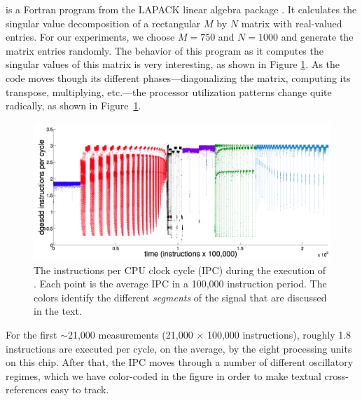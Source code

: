\svd is a Fortran program from the LAPACK linear algebra package
\cite{lapack}.  It calculates the singular value decomposition of a
rectangular $M$ by $N$ matrix with real-valued entries.  For our experiments, we
choose $M=750$ and $N=1000$ and generate the matrix entries randomly.
% 
% 
The behavior of this program as it computes the singular values of
this matrix is very interesting, as shown in Figure
\ref{fig:svd-ts-colored}.  As the code moves though its different
phases---diagonalizing the matrix, computing its transpose,
multiplying, etc.---the processor utilization patterns change quite radically,
as shown in Figure~\ref{fig:svd-ts-colored}.
\begin{figure}[t]
    \centering
    \includegraphics[width=\columnwidth]{figs/SVD1RegimesColored}
    \caption{The instructions per CPU clock cycle (IPC) during the
      execution of \svd. Each point is the average IPC in a 100,000
      instruction period.  The colors identify the different
      \emph{segments} of the signal that are discussed in the text.}
    \label{fig:svd-ts-colored}
  \end{figure}
For the first $\sim$21,000 measurements (21,000 $\times$ 100,000
instructions), roughly 1.8 instructions are executed per cycle, on the
average, by the eight processing units on this chip.  After that, the
IPC moves through a number of different oscillatory regimes, which we
have color-coded in the figure in order to make textual
cross-references easy to track.

